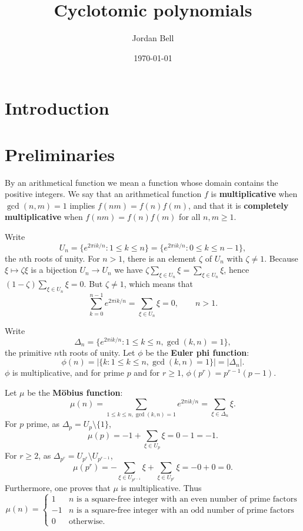 \documentclass{amsart}
\theoremstyle{definition}
\begin{document}
\title{Cyclotomic polynomials}
\author{Jordan Bell}
\address{Department of Mathematics, University of Toronto}
\date{\today}

\maketitle

\tableofcontents

\section{Introduction}

\section{Preliminaries}
By an arithmetical function we mean a function whose domain contains the positive integers. We say that an arithmetical function $f$ is
\textbf{multiplicative} when $\gcd(n,m)=1$ implies $f(nm)=f(n)f(m)$, and that it is \textbf{completely multiplicative} when $f(nm)=f(n)f(m)$ for all $n,m \geq 1$.

Write
\[
U_n=\{e^{2\pi ik/n}: 1 \leq k \leq n\} = \{e^{2\pi ik/n}: 0 \leq k \leq n-1\},
\]
 the  $n$th roots of unity. 
For $n>1$, there is an element  $\zeta$ of $U_n$ with $\zeta \neq 1$. Because $\xi \mapsto \zeta \xi$ is a bijection $U_n \to U_n$ we have
$\zeta \sum_{\xi \in U_n} \xi = \sum_{\xi \in U_n} \xi$,
hence $(1-\zeta) \sum_{\xi \in U_n} \xi = 0$. But $\zeta \neq 1$, which means that
\[
\sum_{k=0}^{n-1} e^{2\pi ik/n} = \sum_{\xi \in U_n} \xi = 0,\qquad n>1.
\]


Write
\[
\Delta_n = \{e^{2\pi ik/n}: 1 \leq k \leq n, \gcd(k,n)=1\},
\]
 the primitive $n$th roots
of unity. 
Let $\phi$ be the \textbf{Euler phi function}:
\[
\phi(n) = |\{k: 1 \leq k \leq n, \gcd(k,n)=1\}|=|\Delta_n|.
\]
$\phi$ is multiplicative, and for prime $p$ and for $r \geq 1$, $\phi(p^r)=p^{r-1}(p-1)$.



Let $\mu$ be the \textbf{M\"obius function}:
\[
\mu(n) =\sum_{1\le k\le n, \gcd(k,n)=1} e^{2\pi ik/n}
=
 \sum_{\xi \in \Delta_n} \xi.
\]
For $p$ prime, as $\Delta_p = U_p \setminus \{1\}$,
\[
\mu(p) = -1+\sum_{\xi \in U_p} \xi  = 0-1=-1.
\]
For $r \geq 2$, as $\Delta_{p^r} = U_{p^r} \setminus U_{p^{r-1}}$,
\[
\mu(p^r) =-\sum_{\xi \in U_{p^{r-1}}} \xi+ \sum_{\xi \in U_{p^r}} \xi = -0+0=0.
\]
Furthermore, one proves  that $\mu$ is multiplicative. Thus
\[
\mu(n) =
\begin{cases}
1&\textrm{$n$ is a square-free integer with an even number of prime factors}\\
-1&\textrm{$n$ is a square-free integer with an odd number of prime factors}\\
0&\textrm{otherwise}.
\end{cases}
\]
\end{document}

